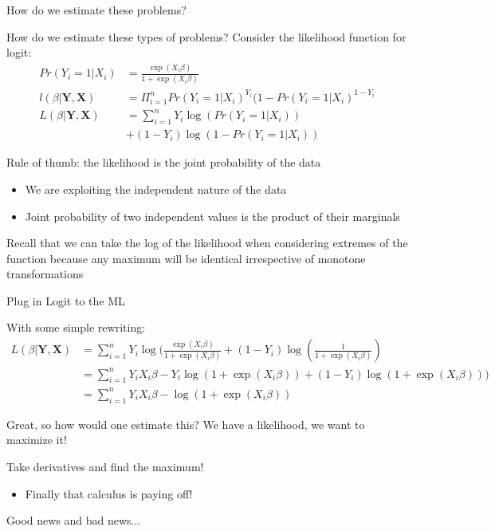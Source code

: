 \documentclass[notes,11pt, aspectratio=169]{beamer}
\newenvironment{wideitemize}{\itemize\addtolength{\itemsep}{10pt}}{\enditemize}
\begin{document}
  \begin{frame}{How do we estimate these problems?}
    \begin{wideitemize}
    \item     How do we estimate these types of problems? Consider the likelihood function for logit:
    \begin{align*}
      Pr(Y_{i} = 1 | X_{i} ) &= \frac{\exp(X_{i}\beta)}{1+\exp(X_{i}\beta)}\\
      l(\beta|\mathbf{Y}, \mathbf{X}) &= \Pi_{i=1}^{n} Pr(Y_{i} = 1 | X_{i} )^{Y_{i}}(1-Pr(Y_{i} = 1 | X_{i} )^{1-Y_{i}}\\
      L(\beta|\mathbf{Y}, \mathbf{X}) &= \sum_{i=1}^{n} Y_{i}\log(Pr(Y_{i} = 1 | X_{i} ))\\
                             &+  (1-Y_{i})\log(1-Pr(Y_{i} = 1 | X_{i} ))
    \end{align*}
  \item Rule of thumb: the likelihood is the joint probability of the data
    \begin{itemize}
    \item We are exploiting the independent nature of the data
    \item Joint probability of two independent values is the product
      of their marginals
    \end{itemize}
  \item Recall that we can take the log of the likelihood when
    considering extremes of the function because any maximum will be
    identical irrespective of monotone transformations
  \end{wideitemize}
  \end{frame}

  \begin{frame}{Plug in Logit to the ML}
    \begin{wideitemize}
      
    \item    With some simple rewriting:
    \begin{align*}
      L(\beta|\mathbf{Y}, \mathbf{X}) &= \sum_{i=1}^{n} Y_{i}\log(\frac{\exp(X_{i}\beta)}{1+\exp(X_{i}\beta)} +  (1-Y_{i})\log(\frac{1}{1+\exp(X_{i}\beta)})\\
      &= \sum_{i=1}^{n} Y_{i}X_{i}\beta - Y_{i}\log(1+\exp(X_{i}\beta)) +  (1-Y_{i})\log(1+\exp(X_{i}\beta)))\\
      &= \sum_{i=1}^{n} Y_{i}X_{i}\beta - \log(1+\exp(X_{i}\beta))
    \end{align*}
    \item Great, so how would one estimate this? We have a likelihood, we want to maximize it!

    \item  Take derivatives and find the maximum!
      \begin{itemize}
      \item Finally that calculus is paying off!
      \end{itemize}

    \item Good news and bad news... 
    \end{wideitemize}
  \end{frame}
\end{document}
